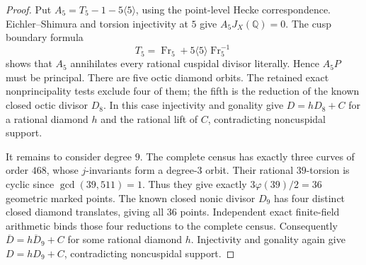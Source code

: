 \begin{proof}
Put $A_5=T_5-1-5\langle5\rangle$, using the point-level Hecke
correspondence. Eichler--Shimura and torsion injectivity at $5$
give $A_5J_X(\mathbb Q)=0$. The cusp boundary formula
\[
 T_5=\operatorname{Fr}_5+
                5\langle5\rangle\operatorname{Fr}_5^{-1}
\]
shows that $A_5$ annihilates every rational cuspidal divisor
literally. Hence $A_5P$ must be principal.
There are five octic diamond orbits. The retained exact
nonprincipality tests exclude four of them; the fifth is the
reduction of the known closed octic divisor $D_8$.
In this case injectivity and gonality give
$D=hD_8+C$ for a rational diamond $h$ and the rational lift of
$C$, contradicting noncuspidal support.

It remains to consider degree $9$.
The complete census has exactly three curves of order $468$,
whose $j$-invariants form a degree-$3$ orbit.
Their rational $39$-torsion is cyclic since $\gcd(39,511)=1$.
Thus they give exactly $3\varphi(39)/2=36$ geometric marked
points. The known closed nonic divisor $D_9$ has four distinct
closed diamond translates, giving all $36$ points.
Independent exact finite-field arithmetic binds those four
reductions to the complete census.
Consequently $\overline D=\overline{hD_9}+C$ for some rational
diamond $h$. Injectivity and gonality again give $D=hD_9+C$,
contradicting noncuspidal support.
\end{proof}
